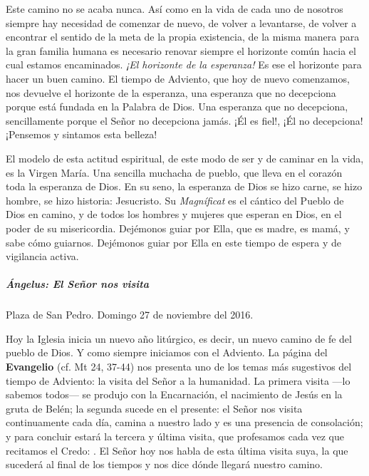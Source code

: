 Este camino no se acaba nunca. Así como en la vida de cada uno de nosotros siempre hay necesidad de comenzar de nuevo, de volver a levantarse, de volver a encontrar el sentido de la meta de la propia existencia, de la misma manera para la gran familia humana es necesario renovar siempre el horizonte común hacia el cual estamos encaminados. \emph{¡El horizonte de la esperanza!} Es ese el horizonte para hacer un buen camino. El tiempo de Adviento, que hoy de nuevo comenzamos, nos devuelve el horizonte de la esperanza, una esperanza que no decepciona porque está fundada en la Palabra de Dios. Una esperanza que no decepciona, sencillamente porque el Señor no decepciona jamás. ¡Él es fiel!, ¡Él no decepciona! ¡Pensemos y sintamos esta belleza!

El modelo de esta actitud espiritual, de este modo de ser y de caminar en la vida, es la Virgen María. Una sencilla muchacha de pueblo, que lleva en el corazón toda la esperanza de Dios. En su seno, la esperanza de Dios se hizo carne, se hizo hombre, se hizo historia: Jesucristo. Su \emph{Magníficat} es el cántico del Pueblo de Dios en camino, y de todos los hombres y mujeres que esperan en Dios, en el poder de su misericordia. Dejémonos guiar por Ella, que es madre, es mamá, y sabe cómo guiarnos. Dejémonos guiar por Ella en este tiempo de espera y de vigilancia activa.

\subparagraph{Ángelus: El Señor nos 	visita}\label{uxe1ngelus-el-seuxf1or-nos-visita}

Plaza de San Pedro. Domingo 27 de noviembre del 2016.

Hoy la Iglesia inicia un nuevo año litúrgico, es decir, un nuevo camino de fe del pueblo de Dios. Y como siempre iniciamos con el Adviento. La página del \textbf{Evangelio} (cf. Mt 24, 37-44) nos presenta uno de los temas más sugestivos del tiempo de Adviento: la visita del Señor a la humanidad. La primera visita ---lo sabemos todos--- se produjo con la Encarnación, el nacimiento de Jesús en la gruta de Belén; la segunda sucede en el presente: el Señor nos visita continuamente cada día, camina a nuestro lado y es una presencia de consolación; y para concluir estará la tercera y última visita, que profesamos cada vez que recitamos el Credo: . El Señor hoy nos habla de esta última visita suya, la que sucederá al final de los tiempos y nos dice dónde llegará nuestro camino.

